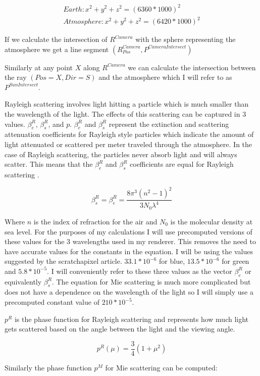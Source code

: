 \documentclass[12pt, letterpaper]{article}
\begin{document}
\begin{gather*}
  Earth: x^2 + y^2 + z^2 = (6360 * 1000)^2 \\
  Atmosphere: x^2 + y^2 + z^2 = (6420 * 1000)^2
\end{gather*}

If we calculate the intersection of $R^{Camera}$ with the sphere representing
the atmosphere we get a line segment $(R^{Camera}_{Pos}, P^{CameraIntersect})$

Similarly at any point $X$ along $R^{Camera}$ we can calculate the intersection
between the ray $(Pos = X, Dir = S)$ and the atmosphere which I will refer to as
$P^{SunIntersect}$.

Rayleigh scattering involves light hitting a particle which is much smaller than
the wavelength of the light. The effects of this scattering can be captured in 3
values. $\beta^R_e$, $\beta^R_s$, and $p$. $\beta^R_e$ and $\beta^R_s$ represent the
extinction and scattering attenuation coefficients for Rayleigh style particles
which indicate the amount of light attenuated or scattered per meter traveled
through the atmosphere. In the case of Rayleigh scattering, the
particles never absorb light and will always scatter. This means that the
$\beta^R_e$ and $\beta^R_s$ coefficients are equal for Rayleigh scattering \cite{nishita}.

\[
  \beta^R_s = \beta^R_e = \frac{8 \pi^3 (n^2 - 1)^2}{3N_0\lambda^4}
\]

Where $n$ is the index of refraction for the air and $N_0$ is the molecular density at
sea level. For the purposes of my calculations I will use precomputed versions
of these values for the 3 wavelengths used in my renderer. This removes the need
to have accurate values for the constants in the equation. I will be using the
values suggested by the scratchapixel article. $33.1 * 10^{-6}$ for blue, $13.5 *
10^{-6}$ for green and $5.8 * 10^{-5}$. I will conveniently refer to these three
values as the vector $\beta^R_e$ or equivalently $\beta^R_s$. The equation for
Mie scattering is much more complicated but does not have a dependence on the
wavelength of the light so I will simply use a precomputed constant value of
$210 * 10^{-5}$.

$p^R$ is the phase function for Rayleigh scattering and represents how much
light gets scattered based on the angle between the light and the viewing angle.

\[
  p^R(\mu) = \frac{3}{4}(1 + \mu^2)
\]

Similarly the phase function $p^M$ for Mie scattering can be computed:
\end{document}
